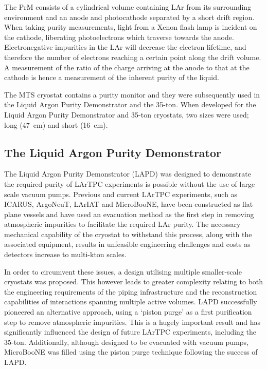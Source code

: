 The PrM consists of a cylindrical volume containing LAr from its surrounding environment and an anode and photocathode separated by a short drift region.  When taking purity measurements, light from a Xenon flash lamp is incident on the cathode, liberating photoelectrons which traverse towards the anode.  Electronegative impurities in the LAr will decrease the electron lifetime, and therefore the number of electrons reaching a certain point along the drift volume.  A measurement of the ratio of the charge arriving at the anode to that at the cathode is hence a measurement of the inherent purity of the liquid.

The MTS cryostat contains a purity monitor and they were subsequently used in the Liquid Argon Purity Demonstrator and the 35-ton.  When developed for the Liquid Argon Purity Demonstrator and 35-ton cryostats, two sizes were used; long (47~cm) and short (16~cm).

\subsection{The Liquid Argon Purity Demonstrator}\label{sec:LAPD}

The Liquid Argon Purity Demonstrator (LAPD) \cite{MTS2011,LAPD2014,LAPDJINST2014} was designed to demonstrate the required purity of LArTPC experiments is possible without the use of large scale vacuum pumps.  Previous and current LArTPC experiments, such as ICARUS, ArgoNeuT, LArIAT and MicroBooNE, have been constructed as flat plane vessels and have used an evacuation method as the first step in removing atmospheric impurities to facilitate the required LAr purity.  The necessary mechanical capability of the cryostat to withstand this process, along with the associated equipment, results in unfeasible engineering challenges and costs as detectors increase to multi-kton scales.

In order to circumvent these issues, a design utilising multiple smaller-scale cryostats was proposed.  This however leads to greater complexity relating to both the engineering requirements of the piping infrastructure and the reconstruction capabilities of interactions spanning multiple active volumes.  LAPD successfully pioneered an alternative approach, using a `piston purge' as a first purification step to remove atmospheric impurities.  This is a hugely important result and has significantly influenced the design of future LArTPC experiments, including the 35-ton.  Additionally, although designed to be evacuated with vacuum pumps, MicroBooNE was filled using the piston purge technique following the success of LAPD.

